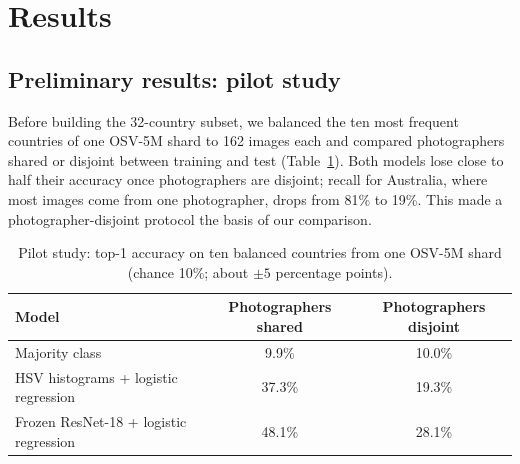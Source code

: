 \documentclass[11pt]{article}
\begin{document}
\section{Results}
\subsection{Preliminary results: pilot study}
Before building the 32-country subset, we balanced the ten most frequent countries of one OSV-5M shard to
162 images each and compared photographers shared or disjoint between training and test
(Table~\ref{tab:pilot}). Both models lose close to half their accuracy once photographers are disjoint;
recall for Australia, where most images come from one photographer, drops from 81\% to 19\%. This made a
photographer-disjoint protocol the basis of our comparison.

\begin{table}[!htbp]
\centering\small
\caption{Pilot study: top-1 accuracy on ten balanced countries from one OSV-5M shard (chance 10\%; about $\pm5$ percentage points).}
\label{tab:pilot}
\begin{tabular}{@{}lcc@{}}
\toprule
Model & Photographers shared & Photographers disjoint \\
\midrule
Majority class & 9.9\% & 10.0\% \\
HSV histograms + logistic regression & 37.3\% & 19.3\% \\
Frozen ResNet-18 + logistic regression & 48.1\% & 28.1\% \\
\bottomrule
\end{tabular}
\end{table}
\end{document}
